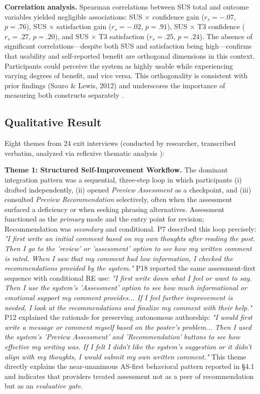 \documentclass[]{llncs}
\begin{document}
\textbf{Correlation analysis.} Spearman correlations between SUS total and outcome variables yielded 
negligible associations: SUS $\times$ confidence gain ($r_s = -.07$, 
$p = .76$), SUS $\times$ satisfaction gain ($r_s = -.02$, $p = .91$), 
SUS $\times$ T3 confidence ($r_s = .27$, $p = .20$), and SUS $\times$ 
T3 satisfaction ($r_s = .25$, $p = .24$). The absence of significant 
correlations---despite both SUS and satisfaction being high---confirms 
that usability and self-reported benefit are orthogonal dimensions in 
this context. Participants could perceive the system as highly usable 
while experiencing varying degrees of benefit, and vice versa. This 
orthogonality is consistent with prior findings (Sauro \& Lewis, 2012) 
and underscores the importance of measuring both constructs separately \cite{ma2016usability}.


\subsection{Qualitative Result}

Eight themes from 24 exit interviews (conducted by researcher, transcribed verbatim, analyzed via reflexive thematic analysis \cite{Braun2006}):




\textbf{Theme 1: Structured Self-Improvement Workflow.} 
The dominant integration pattern was a sequential, three-step loop in which participants (i) drafted independently, (ii) opened \textit{Preview Assessment} as a checkpoint, and (iii) consulted \textit{Preview Recommendation} selectively, often when the assessment surfaced a deficiency or when seeking phrasing alternatives. Assessment functioned as the \textit{primary} mode and the entry point for revision; Recommendation was \textit{secondary} and conditional. P7 described this loop precisely: \textit{"I first write an initial comment based on my own thoughts after reading the post. Then I go to the 'review' or 'assessment' option to see how my written comment is rated. When I saw that my comment had low information, I checked the recommendations provided by the system."} P18 reported the same assessment-first sequence with conditional RE use: \textit{"I first write down what I feel or want to say. Then I use the system's 'Assessment' option to see how much informational or emotional support my comment provides... If I feel further improvement is needed, I look at the recommendations and finalize my comment with their help."} P12 explained the rationale for preserving autonomous authorship: \textit{"I would first write a message or comment myself based on the poster's problem... Then I used the system's 'Preview Assessment' and 'Recommendation' buttons to see how effective my writing was. If I felt I didn't like the system's suggestion or it didn't align with my thoughts, I would submit my own written comment."} This theme directly explains the near-unanimous AS-first behavioral pattern reported in §4.1 and indicates that providers treated assessment not as a peer of recommendation but as an \textit{evaluative gate}.
\end{document}
